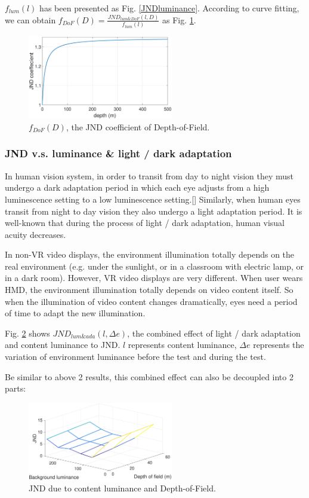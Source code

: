 $f_{lum}(l)$ has been presented as Fig. \ref{JNDluminance}. According to curve fitting, we can obtain $f_{DoF}(D) = \frac{JND_{lum\&DoF}(l, D)}{f_{lum}(l)}$ as Fig. \ref{JNDdof}.

\begin{figure}
  \centering
  \includegraphics[width=2.5in]{images/JNDdof.eps}
  \caption{$f_{DoF}(D)$, the JND coefficient of Depth-of-Field.}
  \label{JNDdof}
  \end{figure}

\subsubsection{JND v.s. luminance \& light / dark adaptation}

In human vision system, in order to transit from day to night vision they must undergo a dark adaptation period in which each eye adjusts from a high luminescence setting to a low luminescence setting.[] Similarly, when human eyes transit from night to day vision they also undergo a light adaptation period. It is well-known that during the process of light / dark adaptation, human visual acuity decreases.

In non-VR video displays, the environment illumination totally depends on the real environment (e.g. under the sunlight, or in a classroom with electric lamp, or in a dark room). However, VR video displays are very different. When user wears HMD, the environment illumination totally depends on video content itself. So when the illumination of video content changes dramatically, eyes need a period of time to adapt the new illumination.

Fig. \ref{JNDadapt-lum} shows $JND_{lum\&ada}(l, \Delta e)$, the combined effect of light / dark adaptation and content luminance to JND. $l$ represents content luminance, $\Delta e$ represents the variation of environment luminance before the test and during the test. 

Be similar to above 2 results, this combined effect can also be decoupled into 2 parts:

\begin{figure}
  \centering
  \includegraphics[width=2.5in]{images/JNDdof-lum.eps}
  \caption{JND due to content luminance and Depth-of-Field.}
  \label{JNDadapt-lum}
  \end{figure}

